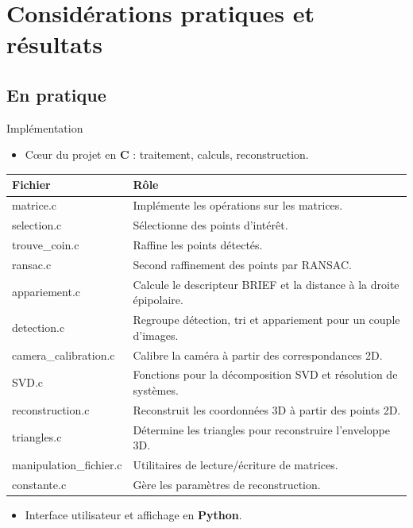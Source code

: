 \section[Considérations pratiques et résultats]{Considérations pratiques et résultats}
\subsection{En pratique}

\begin{frame}{Implémentation}
\begin{itemize}
  \item Cœur du projet en \textbf{C} : traitement, calculs, reconstruction.
\end{itemize}
\pause
\vspace{0.5em}
\tiny{
\renewcommand{\arraystretch}{1.5} %
\setlength{\tabcolsep}{4pt} %
\begin{tabular}{|>{\ttfamily}l|p{8cm}|}
\hline
\textbf{Fichier} & \textbf{Rôle} \\
\hline
matrice.c & Implémente les opérations sur les matrices. \\
\hline
selection.c & Sélectionne des points d'intérêt. \\
\hline
trouve\_coin.c & Raffine les points détectés. \\
\hline
ransac.c & Second raffinement des points par RANSAC. \\
\hline
appariement.c & Calcule le descripteur BRIEF et la distance à la droite épipolaire. \\
\hline
detection.c & Regroupe détection, tri et appariement pour un couple d’images. \\
\hline
camera\_calibration.c & Calibre la caméra à partir des correspondances 2D. \\
\hline
SVD.c & Fonctions pour la décomposition SVD et résolution de systèmes. \\
\hline
reconstruction.c & Reconstruit les coordonnées 3D à partir des points 2D. \\
\hline
triangles.c & Détermine les triangles pour reconstruire l'enveloppe 3D. \\
\hline
manipulation\_fichier.c & Utilitaires de lecture/écriture de matrices. \\
\hline
constante.c & Gère les paramètres de reconstruction. \\
\hline
\end{tabular}
}
\pause
\normalsize
\vspace{0.5em}
\begin{itemize}
  \item Interface utilisateur et affichage en \textbf{Python}.
\end{itemize}
\end{frame}


